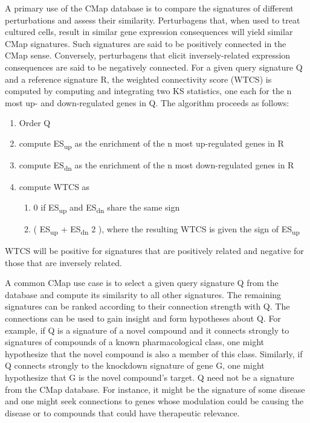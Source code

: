 \documentclass[12pt]{article}
\begin{document}
A primary use of the CMap database is to compare the signatures of different perturbations and assess their similarity. Perturbagens that, when used to treat cultured cells, result in similar gene expression consequences will yield similar CMap signatures. Such signatures are said to be positively connected in the CMap sense. Conversely, perturbagens that elicit inversely-related expression consequences are said to be negatively connected. For a given query signature Q and a reference signature R, the weighted connectivity score (WTCS) is computed by computing and integrating two KS statistics, one each for the n most up- and down-regulated genes in Q. The algorithm proceeds as follows:
\begin{enumerate}
\item Order Q
\item compute ES\textsubscript{up} as the enrichment of the n most up-regulated genes in R
\item compute ES\textsubscript{dn} as the enrichment of the n most down-regulated genes in R
\item compute WTCS as 
\begin{enumerate}
	\item 0 if ES\textsubscript{up} and ES\textsubscript{dn} share the same sign
	\item ( \lvert ES\textsubscript{up} \rvert + \lvert ES\textsubscript{dn} \rvert \/ 2 ), where the resulting WTCS is given the sign of ES\textsubscript{up}
\end{enumerate}
\end{enumerate}

WTCS will be positive for signatures that are positively related and negative for those that are inversely related.

A common CMap use case is to select a given query signature Q from the database and compute its similarity to all other signatures. The remaining signatures can be ranked according to their connection strength with Q. The connections can be used to gain insight and form hypotheses about Q. For example, if Q is a signature of a novel compound and it connects strongly to signatures of compounds of a known pharmacological class, one might hypothesize that the novel compound is also a member of this class. Similarly, if Q connects strongly to the knockdown signature of gene G, one might hypothesize that G is the novel compound's target. Q need not be a signature from the CMap database. For instance, it might be the signature of some disease and one might seek connections to genes whose modulation could be causing the disease or to compounds that could have therapeutic relevance. 
\end{document}
